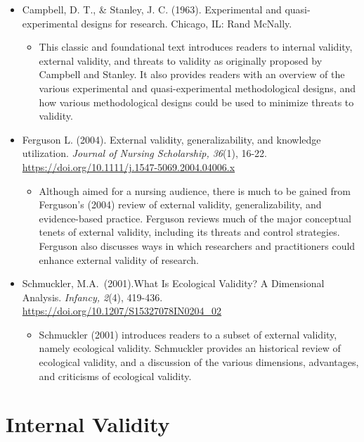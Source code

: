 \documentclass[
  11pt,
]{book}
\providecommand{\tightlist}{%
  \setlength{\itemsep}{0pt}\setlength{\parskip}{0pt}}
\begin{document}
\begin{itemize}
\tightlist
\item
  Campbell, D. T., \& Stanley, J. C. (1963). Experimental and quasi- experimental designs for research. Chicago, IL: Rand McNally.

  \begin{itemize}
  \tightlist
  \item
    This classic and foundational text introduces readers to internal validity, external validity, and threats to validity as originally proposed by Campbell and Stanley. It also provides readers with an overview of the various experimental and quasi-experimental methodological designs, and how various methodological designs could be used to minimize threats to validity.
  \end{itemize}
\item
  Ferguson L. (2004). External validity, generalizability, and knowledge utilization. \emph{Journal of Nursing Scholarship, 36}(1), 16-22. \url{https://doi.org/10.1111/j.1547-5069.2004.04006.x}

  \begin{itemize}
  \tightlist
  \item
    Although aimed for a nursing audience, there is much to be gained from Ferguson's (2004) review of external validity, generalizability, and evidence-based practice. Ferguson reviews much of the major conceptual tenets of external validity, including its threats and control strategies. Ferguson also discusses ways in which researchers and practitioners could enhance external validity of research.
  \end{itemize}
\item
  Schmuckler, M.A.~(2001).What Is Ecological Validity? A Dimensional Analysis. \emph{Infancy, 2}(4), 419-436. \url{https://doi.org/10.1207/S15327078IN0204_02}

  \begin{itemize}
  \tightlist
  \item
    Schmuckler (2001) introduces readers to a subset of external validity, namely ecological validity. Schmuckler provides an historical review of ecological validity, and a discussion of the various dimensions, advantages, and criticisms of ecological validity.
  \end{itemize}
\end{itemize}

\section{Internal Validity}\label{internal-validity}
\end{document}
